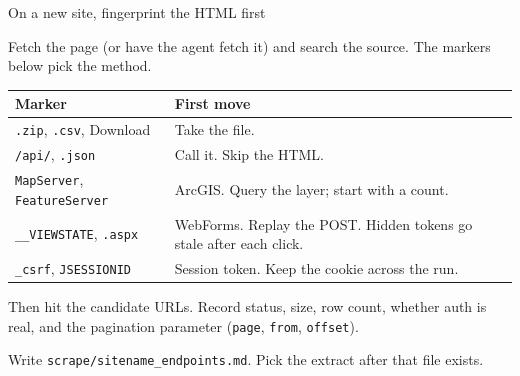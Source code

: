 \documentclass[aspectratio=1610, xcolor={dvipsnames}]{beamer}
\begin{document}
\begin{frame}{On a new site, fingerprint the HTML first}

    Fetch the page (or have the agent fetch it) and search the source.
    The markers below pick the method.

    \vspace{0.25cm}
    \renewcommand{\arraystretch}{1.18}
    \footnotesize
    \begin{tabular}{@{}p{} p{}@{}}
        \toprule
        {\color{bhblue}\bfseries Marker} & {\color{bhblue}\bfseries First move}                                \\
        \midrule
        \texttt{.zip}, \texttt{.csv}, Download
                                         & Take the file.                                                      \\
        \texttt{/api/}, \texttt{.json}
                                         & Call it. Skip the HTML.                                             \\
        \texttt{MapServer}, \texttt{FeatureServer}
                                         & ArcGIS. Query the layer; start with a count.                        \\
        \texttt{\_\_VIEWSTATE}, \texttt{.aspx}
                                         & WebForms. Replay the POST. Hidden tokens go stale after each click. \\
        \texttt{\_csrf}, \texttt{JSESSIONID}
                                         & Session token. Keep the cookie across the run.                      \\
        \bottomrule
    \end{tabular}

    \vspace{0.3cm}
    Then hit the candidate URLs. Record status, size, row count, whether auth is
    real, and the pagination parameter (\texttt{page}, \texttt{from}, \texttt{offset}).

    \vspace{0.12cm}
    Write \texttt{scrape/sitename\_endpoints.md}. Pick the extract after that file exists.

\end{frame}
\end{document}
